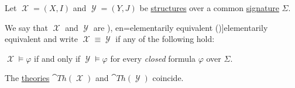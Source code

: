 \begin{definition}\label{def:elementary_equivalence}
  Let \( \mscrX = (X, I) \) and \( \mscrY = (Y, J) \) be \hyperref[def:fol_structure]{structures} over a common \hyperref[def:fol_signature]{signature} \( \Sigma \).

  We say that \( \mscrX \) and \( \mscrY \) are \term[ru=элементарно эквивалентные (алгебраические системы) (\cite[235]{Мальцев1970АлгебраическиеСистемы}), en=elementarily equivalent (\cite[def. 2.3.3]{Hinman2005Logic})]{elementarily equivalent} and write \( \mscrX \equiv \mscrY \) if any of the following hold:
  \begin{thmenum}
     \( \mscrX \vDash \varphi \) if and only if \( \mscrY \vDash \varphi \) for every \emph{closed} formula \( \varphi \) over \( \Sigma \).

    \smallskip

     The \hyperref[def:fol_theory/model]{theories} \( \cat{Th}(\mscrX) \) and \( \cat{Th}(\mscrY) \) coincide.
  \end{thmenum}
\end{definition}

